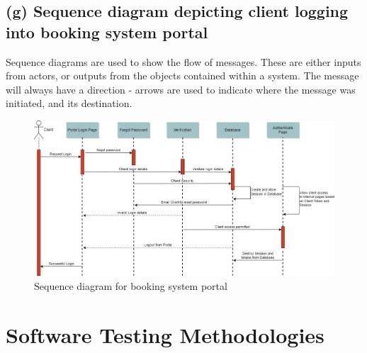 \documentclass{article}
\begin{document}
\subsection{(g) Sequence diagram depicting client logging into booking system portal}
\begin{flushleft}
Sequence diagrams are used to show the flow of messages. These are either inputs from actors, or outputs from the objects contained within a system. The message will always have a direction - arrows are used to indicate where the message was initiated, and its destination.
\end{flushleft}
\begin{figure}[h]
	\centering
	\includegraphics[width=\columnwidth]{2_g_sequence_diagram_login.jpg}
	\caption{Sequence diagram for booking system portal}
	\label{fig:Seq_booking_system_portal}
\end{figure}

\newpage
\section{Software Testing Methodologies}
\end{document}
